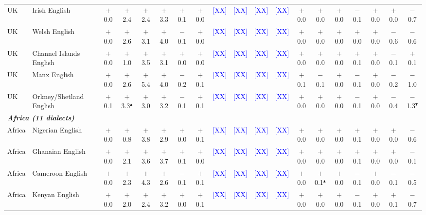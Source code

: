 \begin{table}[t]
\begin{tabular}{llccccccccccccccccc}
UK & Irish English & $+$0.0 & $+$2.4 & $+$2.4 & $+$3.3 & $+$0.1 & $+$0.0 & \textcolor{blue}{[XX]} & \textcolor{blue}{[XX]} & \textcolor{blue}{[XX]} & \textcolor{blue}{[XX]} & $+$0.0 & $+$0.0 & $+$0.0 & $-$0.1 & $+$0.0 & $+$0.0 & $-$0.7 \\
UK & Welsh English & $+$0.0 & $+$2.6 & $+$3.1 & $+$4.0 & $-$0.1 & $+$0.0 & \textcolor{blue}{[XX]} & \textcolor{blue}{[XX]} & \textcolor{blue}{[XX]} & \textcolor{blue}{[XX]} & $+$0.0 & $+$0.0 & $+$0.0 & $+$0.0 & $+$0.0 & $-$0.6 & $-$0.6 \\
UK & Channel Islands English & $+$0.0 & $+$1.0 & $+$3.5 & $+$3.1 & $+$0.0 & $+$0.0 & \textcolor{blue}{[XX]} & \textcolor{blue}{[XX]} & \textcolor{blue}{[XX]} & \textcolor{blue}{[XX]} & $+$0.0 & $+$0.0 & $+$0.0 & $+$0.1 & $+$0.0 & $-$0.1 & $+$0.1 \\
UK & Manx English & $+$0.0 & $+$2.6 & $+$5.4 & $+$4.0 & $-$0.2 & $+$0.1 & \textcolor{blue}{[XX]} & \textcolor{blue}{[XX]} & \textcolor{blue}{[XX]} & \textcolor{blue}{[XX]} & $+$0.1 & $-$0.1 & $+$0.0 & $-$0.1 & $+$0.0 & $-$0.2 & $-$1.0 \\
UK & Orkney/Shetland English & $+$0.1 & $+$3.3$^\blacktriangle$ & $+$3.0 & $+$3.2 & $-$0.1 & $+$0.1 & \textcolor{blue}{[XX]} & \textcolor{blue}{[XX]} & \textcolor{blue}{[XX]} & \textcolor{blue}{[XX]} & $+$0.0 & $+$0.0 & $+$0.0 & $-$0.1 & $+$0.0 & $-$0.4 & $-$1.3$^\blacktriangledown$ \\
\midrule
\multicolumn{19}{l}{\textit{\textbf{Africa (11 dialects)}}} \\
Africa & Nigerian English & $+$0.0 & $+$0.8 & $+$3.8 & $+$2.9 & $+$0.0 & $+$0.1 & \textcolor{blue}{[XX]} & \textcolor{blue}{[XX]} & \textcolor{blue}{[XX]} & \textcolor{blue}{[XX]} & $+$0.0 & $+$0.0 & $+$0.0 & $+$0.1 & $+$0.0 & $+$0.0 & $-$0.6 \\
Africa & Ghanaian English & $+$0.0 & $+$2.1 & $+$3.6 & $+$3.7 & $+$0.1 & $+$0.0 & \textcolor{blue}{[XX]} & \textcolor{blue}{[XX]} & \textcolor{blue}{[XX]} & \textcolor{blue}{[XX]} & $+$0.0 & $+$0.0 & $+$0.0 & $+$0.1 & $+$0.0 & $+$0.0 & $-$0.1 \\
Africa & Cameroon English & $+$0.0 & $+$2.3 & $+$4.3 & $+$2.6 & $-$0.1 & $+$0.1 & \textcolor{blue}{[XX]} & \textcolor{blue}{[XX]} & \textcolor{blue}{[XX]} & \textcolor{blue}{[XX]} & $+$0.0 & $+$0.1$^\blacktriangle$ & $+$0.0 & $-$0.1 & $+$0.0 & $-$0.1 & $-$0.5 \\
Africa & Kenyan English & $+$0.0 & $+$2.0 & $+$2.4 & $+$3.2 & $+$0.0 & $+$0.1 & \textcolor{blue}{[XX]} & \textcolor{blue}{[XX]} & \textcolor{blue}{[XX]} & \textcolor{blue}{[XX]} & $+$0.0 & $+$0.0 & $+$0.0 & $-$0.1 & $+$0.0 & $+$0.1 & $-$0.7 \\

\end{tabular}
\end{table}
